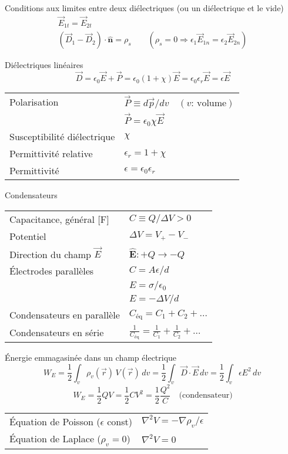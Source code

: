 \documentclass[10pt,landscape]{article}
\newcommand{\extraline}{\vspace{1em}}
\newcommand{\halfline}{\vspace{0.5em}}
\newcommand{\tableindent}{\hspace{1.5em}}
\newcommand{\uvec}[1]{\ensuremath{\boldsymbol{\hat{#1}}}}
\begin{document}
\begin{multicols}{3}
\extraline
Conditions aux limites entre deux diélectriques (ou un diélectrique et le vide)
\begin{gather*}
\vec{E}_{1t} =\vec{ E}_{2t}  \\
 (\vec{D}_1 - \vec{D}_2) \cdot \uvec{n} = \rho_s  \qquad (\rho_s=0 \Rightarrow \epsilon_1 \vec{E}_{1n} = \epsilon_2 \vec{E}_{2n})
\end{gather*}

\halfline
Diélectriques linéaires
\[ \vec{D} = \epsilon_0\vec{E} + \vec{P} = \epsilon_0(1+\chi)\vec{E} = \epsilon_0\epsilon_r\vec{E} = \epsilon\vec{E}  \]
\begin{tabular}{@{\tableindent}ll@{}}
	Polarisation  & $\vec{P} \equiv d\vec{p}/dv \quad (\text{$v$: volume})$ \\
	  & $\vec{P} = \epsilon_0\chi\vec{E}$ \\
	Susceptibilité diélectrique  & $\chi$ \\
	Permittivité relative &  $\epsilon_r=1+\chi$ \\
	Permittivité & $\epsilon = \epsilon_0\epsilon_r$
\end{tabular}

\extraline
Condensateurs  \\
\halfline
\begin{tabular}{@{\tableindent}ll@{}}
	Capacitance, général [\si{\farad}] & $\displaystyle C \equiv {Q}/{\Delta V}  > 0 $ \\
	Potentiel  & $\Delta V = V_+ - V_-$ \\
	Direction du champ $\vec{E}$ & $\uvec{E}: +Q \to -Q$ \\
	Électrodes parallèles & $C = {A\epsilon}/{d}$ \\
	 & $E = {\sigma}/{\epsilon_0}$ \\
	 & $E =  -{\Delta V}/{d}$ \\
	Condensateurs en parallèle  & $C_\text{éq} = C_1 + C_2 + \dots$ \\
	Condensateurs en série & $\frac{1}{C_\text{éq}} = \frac{1}{C_1} + \frac{1}{C_2} + \dots $\\
\end{tabular}


\halfline
Énergie emmagasinée dans un champ électrique
\[ W_E = \frac{1}{2} \int_v  \rho_v(\vec{r})  \, V(\vec{r}) \, dv 
= \frac{1}{2} \int_v  \vec{D}\cdot\vec{E} \, dv 
= \frac{1}{2} \int_v  \epsilon E^2 \, dv 
\frac{}{}\]
\[ W_E = \frac{1}{2} QV = \frac{1}{2} CV^2 = \frac{1}{2}\frac{Q^2}{C} \quad\text{(condensateur)} \]

\halfline
\begin{tabular}{@{}ll@{}}
	Équation de Poisson ($\epsilon$ const) & $\nabla^2 V = -{\nabla\rho_v}/{\epsilon}$ \\
	Équation de Laplace ($\rho_v=0$) & $\nabla^2 V = 0$ \\ 
\end{tabular}



\end{multicols}
\end{document}
